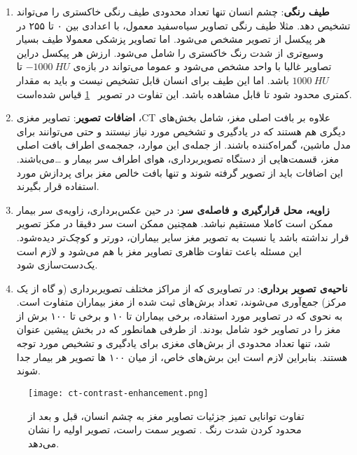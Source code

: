 \begin{enumerate}
        \item \textbf{طیف رنگی}:  چشم انسان تنها تعداد محدودی طیف رنگی خاکستری را می‌تواند تشخیص دهد. مثلا طیف رنگی تصاویر سیاه‌سفید معمول، با اعدادی بین ۰ تا ۲۵۵ در هر پیکسل از تصویر مشخص می‌شود.
        اما تصاویر پزشکی معمولا طیف بسیار وسیع‌تری از شدت رنگ خاکستری را شامل می‌شود. 
        ارزش هر پیکسل دراین تصاویر غالبا با واحد  مشخص می‌شود و عموما می‌تواند در بازه‌ی $-1000\ HU$ تا $1000\ HU$ باشد.
        اما این طیف برای انسان قابل تشخیص نیست و باید به مقدار کمتری محدود شود تا قابل مشاهده باشد. این تفاوت در تصویر ~\ref{fig:ct-contrast-enhancement} 
        قیاس شده‌است.
        \item \textbf{اضافات تصویر}: تصاویر مغزی ،CT علاوه بر بافت اصلی مغز، شامل بخش‌های دیگری هم هستند که در یادگیری و تشخیص مورد نیاز نیستند و حتی می‌توانند برای مدل ماشین، گمراه‌کننده باشند.
        از جمله‌ی این موارد، جمجمه‌ی اطراف بافت اصلی مغز، قسمت‌هایی از دستگاه تصویربرداری، هوای اطراف سر بیمار و \dots می‌باشند.
        این اضافات باید از تصویر گرفته شوند و تنها بافت خالص مغز برای پردازش مورد استفاده قرار بگیرند.
        \item \textbf{زاویه، محل قرار‌گیری و فاصله‌ی سر}: در حین عکس‌برداری، زاویه‌ی سر بیمار ممکن است کاملا مستقیم نباشد.
        همچنین ممکن است سر دقیقا در مکز تصویر قرار نداشته باشد یا نسبت به تصویر مغز سایر بیماران، دورتر و کوچک‌تر دیده‌شود.
        این مسئله باعث تفاوت ظاهری تصاویر مغز با هم می‌شود و لازم است یک‌دست‌سازی شود.
        \item \textbf{ناحیه‌ی تصویر برداری}: در تصاویری که از مراکز مختلف تصویربرداری (و گاه از یک مرکز) جمع‌آوری می‌شوند، 
        تعداد برش‌های ثبت شده از مغز بیماران متفاوت است.
        به نحوی که در تصاویر مورد استفاده، برخی بیماران تا ۱۰ و برخی تا ۱۰۰ برش از مغز را در تصاویر خود شامل بودند.
        از طرفی همانطور که در بخش پیشین عنوان شد، تنها تعداد محدودی از برش‌های مغزی برای یادگیری و تشخیص مورد توجه هستند.
        بنابراین لازم است این برش‌های خاص، از میان ۱۰۰ ها تصویر هر بیمار جدا شوند. 
\end{enumerate}

\begin{figure}[ht]
\centering
\texttt{[image: ct-contrast-enhancement.png]}
\caption[]{تفاوت توانایی تمیز جزئیات تصاویر مغز به چشم انسان، قبل و بعد از محدود کردن شدت رنگ \cite{tan2012contrast}. تصویر سمت راست، تصویر اولیه را نشان می‌دهد.}
\label{fig:ct-contrast-enhancement}
\end{figure}

